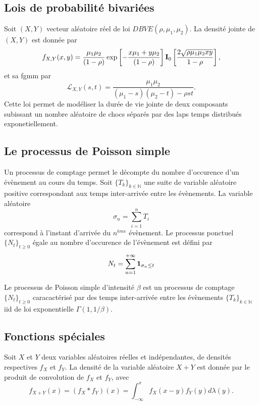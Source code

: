 \subsection{Lois de probabilité bivariées}\label{AppendiceBivariateProbability}
\begin{Def}
Soit $(X,Y)$ vecteur aléatoire réel  de loi $DBVE(\rho,\mu_{1},\mu_{2})$. La densité jointe de $(X,Y)$ est donnée par 
\begin{equation}\label{JointDensityDBVED}
f_{X,Y}(x,y)=\frac{\mu_{1}\mu_{2}}{(1-\rho)}\exp\left[-\frac{x\mu_{1}+y\mu_{2}}{(1-\rho)}\right]
\bold{I}_{0}\left[\frac{2\sqrt{\rho\mu_{1}\mu_{2}xy}}{1-\rho}\right],
\end{equation}
et sa \gls{fgmm} par
\begin{equation}\label{fgmmGDBVE}
\mathcal{L}_{X,Y}(s,t)=\frac{\mu_{1}\mu_{2}}{(\mu_{1}-s)(\mu_{2}-t)-\rho st}.
\end{equation}
Cette loi permet de modéliser la durée de vie jointe de deux composants subissant un nombre aléatoire de chocs séparés par des laps temps distribués exponetiellement.
\end{Def}

\subsection{Le processus de Poisson simple}\label{AppendicePoissonProcess}
Un processus de comptage permet le décompte du nombre d\rq{}occurence d\rq{}un évènement au cours du temps. Soit $\{T_{k}\}_{k\in\mathbb{N}}$ une suite de variable aléatoire positive correspondant aux temps inter-arrivée entre les évènements. La variable aléatoire 
\begin{equation*}
\sigma_{n}=\sum_{i=1}^{n}T_{i}
\end{equation*}
correspond à l\rq{}instant d\rq{}arrivée du $n^{ème}$  évènement. Le processus ponctuel $\{N_{t}\}_{t\geq0}$ égale au nombre d\rq{}occurence de l\rq{}évènement est défini par 
\begin{equation}
N_{t}=\sum_{n=1}^{+\infty}\bold{1}_{\sigma_{n}\leq t}
\end{equation}
\begin{Def}\label{PoissonProcessDefinition} 
Le processus de Poisson simple d\rq{}intensité $\beta$ est un processus de comptage $\{N_{t}\}_{t\geq0}$ caracactérisé par des temps inter-arrivée entre les évènements $\{T_{k}\}_{k\in\mathbb{N}}$ \gls{iid} de loi exponentielle $\Gamma(1,1/\beta)$.
\end{Def}
\subsection{Fonctions spéciales}\label{AppendiceSpecialFunction}
\begin{Def}
Soit $X$ et $Y$ deux variables aléatoires réelles et indépendantes, de densités respectives $f_{X}$ et $f_{Y}$. La densité de la variable aléatoire $X+Y$ est donnée par le produit de convolution de $f_{X}$ et $f_{Y}$, avec
\begin{equation}
f_{X+Y}(x)=\left(f_{X}*f_{Y}\right)(x)=\int_{-\infty}^{x}f_{X}(x-y)f_{Y}(y)d\lambda(y).
\end{equation}  
\end{Def}

